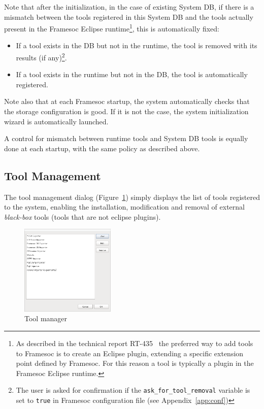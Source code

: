 \documentclass[twoside]{article}
\begin{document}
\begin{sloppypar}
Note that after the initialization, in the case of existing System DB, if there is a mismatch between the tools registered in this System DB and the tools actually present in the Framesoc Eclipse runtime\footnote{As described in the technical report RT-435~\cite{pagano:hal-00830008} the preferred way to add tools to Framesoc is to create an Eclipse plugin, extending a specific extension point defined by Framesoc. For this reason a tool is typically a plugin in the Framesoc Eclipse runtime.}, this is automatically fixed:
\begin{itemize}
 \item If a tool exists in the DB but not in the runtime, the tool is removed with its results (if any)\footnote{The user is asked for confirmation if the \texttt{ask\_for\_tool\_removal} variable is set to \texttt{true} in Framesoc configuration file (see Appendix~\ref{app:conf})}.
 \item If a tool exists in the runtime but not in the DB, the tool is automatically registered.
\end{itemize}

Note also that at each Framesoc startup, the system automatically checks that the storage configuration is good. 
If it is not the case, the system initialization wizard is automatically launched.

A control for mismatch between runtime tools and System DB tools is equally done at each startup, with the same policy as described above.

\subsection{Tool Management}
\label{subsec:tools}


The tool management dialog (Figure~\ref{fig:manage_tools}) simply displays the list of tools registered to the system, 
enabling the installation, modification and removal of external \emph{black-box} tools (tools that are not eclipse plugins).

\begin{figure}[h!]
  \centering
    \includegraphics[width=0.4\textwidth]{images/manage_tools.png}
  \caption{Tool manager}
  \label{fig:manage_tools}
\end{figure}


\end{sloppypar}
\end{document}
